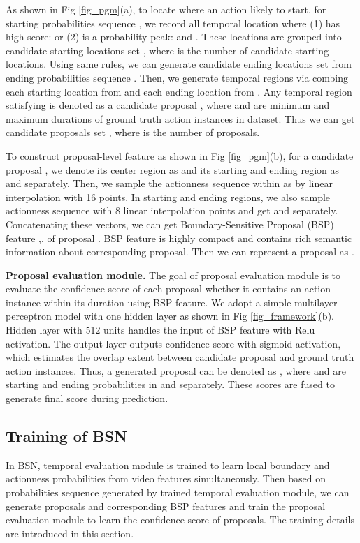 \documentclass[runningheads]{llncs}
\begin{document}
As shown in Fig \ref{fig_pgm}(a), to locate where an action likely to start, for starting probabilities sequence , we record all temporal location  where   (1) has high score:  or  (2) is a probability peak:  and .
These locations are  grouped into candidate starting locations set , where  is the number of candidate starting locations. 
Using same rules, we can generate candidate ending locations set  from ending probabilities sequence .
Then, we generate temporal regions via combing each starting location  from  and each ending location  from . 
Any temporal region  satisfying  is denoted as a candidate proposal , where  and  are minimum and maximum durations of ground truth action instances in dataset. Thus we can get candidate proposals set , where  is the number of proposals. 

To construct proposal-level feature as shown in Fig \ref{fig_pgm}(b), for a candidate proposal , we denote its  center region as  and its starting and ending region as  and  separately. Then, we sample the actionness sequence  within  as   by linear interpolation with 16 points. In starting and ending regions, we also sample actionness  sequence with 8 linear  interpolation points and get  and  separately. Concatenating these vectors, we can get Boundary-Sensitive Proposal (BSP) feature ,, of proposal . 
BSP feature is highly compact and contains rich semantic information about corresponding proposal. 
Then we can represent a proposal as .

\noindent
{\bf Proposal evaluation module.}
The goal of proposal evaluation module is to evaluate the confidence score of each proposal whether it contains an action instance within its duration using BSP feature. We adopt a simple multilayer perceptron model with one hidden layer as shown in Fig \ref{fig_framework}(b). Hidden layer with 512 units  handles the input of BSP feature  with Relu  activation. The output layer outputs confidence score  with sigmoid activation, which estimates the overlap extent between candidate proposal and ground truth action instances. Thus, a generated proposal can be denoted  as , where  and  are starting and ending probabilities in  and  separately. These scores are fused to generate final score during prediction.



\subsection{Training of BSN }

In BSN, temporal evaluation module is trained to learn local boundary and actionness probabilities  from video features simultaneously. Then based on probabilities sequence generated by trained temporal evaluation module, we can generate proposals and corresponding BSP features and train the proposal evaluation module to learn the confidence score of proposals. The training details are introduced in this section.
\end{document}
